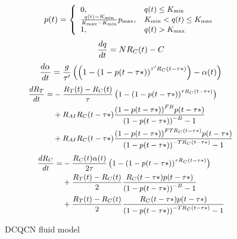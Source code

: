 \begin{figure}[h]
\fbox 
{
\begin{minipage}{\columnwidth}
\begin{equation}
\small
p(t) = \left\{ \begin{array}{ll}
{\rm{0,}} & q(t) \le {K_{\min }}\\
\frac{{q(t) - {K_{\min }}}}{{{K_{\max }} - {K_{\min }}}}{p_{\max }}, & {K_{\min }} < q(t) \le {K_{\max }}\\
{\rm{1,}} & q(t) > {K_{\max }}
\end{array} \right.
\label{eq:mark}
\end{equation}
\begin{equation}
\small
\frac{{dq}}{{dt}} = N{R_C}(t) - C
\label{eq:q}
\end{equation}
\begin{equation}
\small
\frac{{d\alpha }}{{dt}} = \frac{g}{{\tau '}}\left( {\left( {1 - {{(1 - p(t - \tau *))}^{\tau '{R_C}(t - \tau *)}}} \right) - \alpha (t)} \right)
\label{eq:alpha}
\end{equation}
\begin{equation}
\small
\begin{split}
\frac{{d{R_T}}}{{dt}} = & - \frac{{{R_T}(t) - {R_C}(t)}}{\tau }\left( {1 - {{(1 - p(t - \tau *))}^{\tau {R_C}(t - \tau *)}}} \right) \\
& + {R_{AI}}{R_C}(t - \tau *)\frac{{{{(1 - p(t - \tau *))}^{FB}}p(t - \tau *)}}{{{{(1 - p(t - \tau *))}^{ - B}} - 1}} \\
& + {R_{AI}}{R_C}(t - \tau *)\frac{{{{(1 - p(t - \tau *))}^{FT{R_C}(t - \tau *)}}p(t - \tau *)}}{{{{(1 - p(t - \tau *))}^{ - T{R_C}(t - \tau *)}} - 1}}
\end{split}
\label{eq:rt}
\end{equation}
\begin{equation}
\small
\begin{split}
\frac{{d{R_C}}}{{dt}} = & - \frac{{{R_C}(t)\alpha (t)}}{{2\tau }}\left( {1 - {{(1 - p(t - \tau *))}^{\tau {R_C}(t - \tau *)}}} \right) \\
 & + \frac{{{R_T}(t) - {R_C}(t)}}{2}\frac{{{R_C}(t - \tau *)p(t - \tau *)}}{{{{(1 - p(t - \tau *))}^{ - B}} - 1}} \\ 
 & + \frac{{{R_T}(t) - {R_C}(t)}}{2}\frac{{{R_C}(t - \tau *)p(t - \tau *)}}{{{{(1 - p(t - \tau *))}^{ - T{R_C}(t - \tau *)}} - 1}}
\end{split}
\label{eq:rc}
\end{equation}
\end{minipage}
}
\caption{DCQCN fluid model}
\label{fig:dcqcn_model}
\end{figure}
